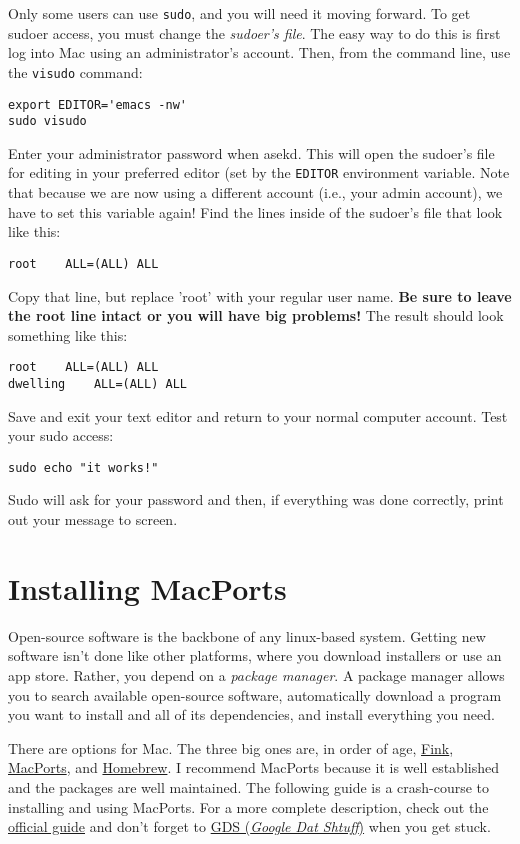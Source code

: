 \documentclass[12pt, letterpaper]{article}
\begin{document}
Only some users can use {\tt sudo}, and you will need it moving forward.  To
get sudoer access, you must change the \emph{sudoer's file}.  The easy way to
do this is first log into Mac using an administrator's account.  Then,
from the command line, use the {\tt visudo} command:
\begin{verbatim}
export EDITOR='emacs -nw'
sudo visudo
\end{verbatim}
Enter your administrator password when asekd.  This will open the sudoer's
file for editing in your preferred editor (set by the {\tt EDITOR} environment
variable.  Note that because we are now using a different account (i.e., your
admin account), we have to set this variable again!
Find the lines inside of the sudoer's file that look like this:
\begin{verbatim}
root    ALL=(ALL) ALL
\end{verbatim}
Copy that line, but replace 'root' with your regular user name.
\textbf{Be sure to leave the root line intact or you will have big problems!}
The result should look something like this:
\begin{verbatim}
root    ALL=(ALL) ALL
dwelling    ALL=(ALL) ALL
\end{verbatim}

Save and exit your text editor and return to your normal computer account.
Test your sudo access:
\begin{verbatim}
sudo echo "it works!"
\end{verbatim}
Sudo will ask for your password and then, if everything was done correctly,
print out your message to screen.

\section{Installing MacPorts}
\label{sec:ports}
Open-source software is the backbone of any linux-based system.  Getting new
software isn't done like other platforms, where you download installers or
use an app store.  Rather, you depend on a \emph{package manager}.  A
package manager allows you to search available open-source software,
automatically download a program you want to install and all of its
dependencies, and install everything you need.

There are options for Mac.  The three big ones are, in order of age,
\href{http://www.finkproject.org/}{Fink},
\href{https://www.macports.org/}{MacPorts}, and
\href{http://brew.sh/}{Homebrew}.
I recommend MacPorts because it is well established and the packages are
well maintained.  The following guide is a crash-course to installing and
using MacPorts.  For a more complete description, check out the
\href{https://guide.macports.org}{official guide} and don't forget to
\href{http://www.google.com}{GDS (\emph{Google Dat Shtuff})} when you get stuck.
\end{document}

